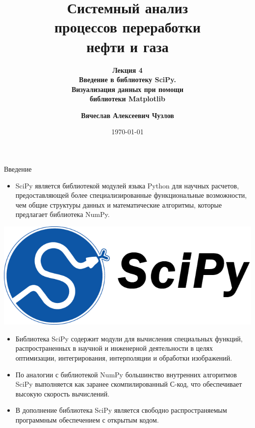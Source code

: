 \documentclass[aspectratio=169, mathserif]{beamer}	%
\title{Системный анализ \\ процессов переработки \\ нефти и газа}
\subtitle{\textcolor{tpugreen}{\textbf{Лекция 4}} \\ \textbf{Введение в библиотеку SciPy. \\ Визуализация данных при помощи \\ библиотеки Matplotlib}}
\author[]{\textbf{Вячеслав Алексеевич Чузлов}}
\institute{к.т.н., доцент ОХИ ИШПР}
\date{\today}
\begin{document}

\titleframe		%

\tocframe{}		%



\begin{frame}[fragile, label=c]{Введение}
\scriptsize
\begin{minipage}{.73\linewidth}
\begin{itemize}
	\item SciPy является библиотекой модулей языка Python для научных расчетов, предоставляющей более специализированные функциональные возможности, чем общие структуры данных и математические алгоритмы, которые предлагает библиотека NumPy.
\end{itemize}
\end{minipage}
\begin{minipage}{.25\linewidth}
	\includegraphics[width=\linewidth]{./pics/scipy_logo}
\end{minipage}
\begin{itemize}
	\item Библиотека SciPy содержит модули для вычисления специальных функций, распространенных в  научной и инженерной деятельности в целях оптимизации, интегрирования, интерполяции и обработки изображений.
	\item 	По аналогии с библиотекой NumPy большинство внутренних алгоритмов SciPy выполняется как заранее скомпилированный С-код, что обеспечивает высокую скорость вычислений.
	\item В дополнение библиотека SciPy является свободно распространяемым программным обеспечением с открытым кодом.
\end{itemize}
\vfill
\end{frame}
\end{document}
